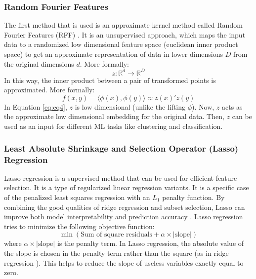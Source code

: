 \documentclass[%
 aip,
 jmp,%
 amsmath,amssymb,
 reprint,%
]{revtex4-2}
\begin{document}
\subsubsection{Random Fourier Features}
The first method that is used is an approximate kernel method called Random Fourier Features (RFF) \cite{ref44}.
It is an unsupervised approach, which maps the input data to a randomized low dimensional feature space
(euclidean inner product space) to get an approximate representation of data in lower dimensions $D$ from the
original dimensions $d$. More formally:
\begin{equation}
    z:\mathbb{R}^d\rightarrow\mathbb{R}^D
\end{equation}
In this way, the inner product between a pair of transformed points is approximated. More formally:
\begin{equation}
    f(x,y)=\langle\phi(x),\phi(y)\rangle\approx z(x)'z(y)
    \label{eq:eq4}
\end{equation}
In Equation \ref{eq:eq4}, $z$ is low dimensional (unlike the lifting $\phi$). Now, $z$ acts as the
approximate low dimensional embedding for the original data. Then, $z$ can be used as an input for
different ML tasks like clustering and classification.

\subsubsection{Least Absolute Shrinkage and Selection Operator (Lasso) Regression}
Lasso regression is a supervised method that can be used for efficient feature selection. It is a type of
regularized linear regression variants. It is a specific case of the penalized least squares regression with
an $L_1$ penalty function. By combining the good qualities of ridge regression \cite{ref45, ref46} and subset
selection, Lasso can improve both model interpretability and prediction accuracy \cite{ref47}. Lasso regression
tries to minimize the following objective function:
\begin{equation}
    \min(\text{Sum of square residuals} + \alpha\times|\text{slope}|)
\end{equation}
where $\alpha\times|\text{slope}|$ is the penalty term. In Lasso regression, the absolute value of the slope is
chosen in the penalty term rather than the square (as in ridge regression \cite{ref46}). This helps to reduce the
slope of useless variables exactly equal to zero.
\end{document}
